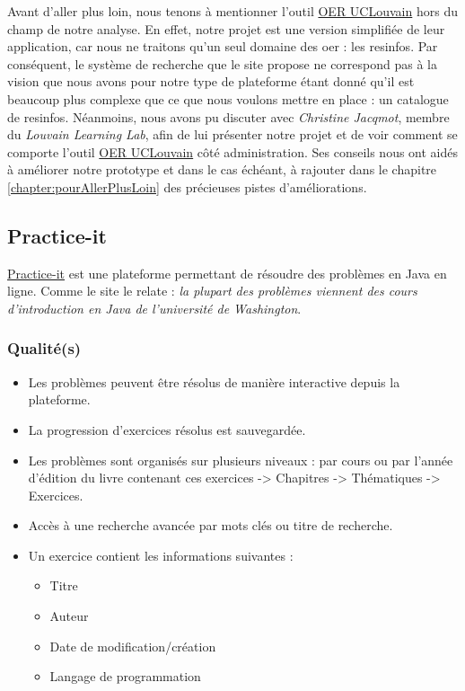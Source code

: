 Avant d'aller plus loin, nous tenons à mentionner l'outil \href{https://oer.uclouvain.be/}{OER UCLouvain} hors du champ de notre analyse. En effet, notre projet est une version simplifiée de leur application, car nous ne traitons qu'un seul domaine des \gls{oer} : les \glspl{resinfo}. Par conséquent, le système de recherche que le site propose ne correspond pas à la vision que nous avons pour notre type de plateforme étant donné qu'il est beaucoup plus complexe que ce que nous voulons mettre en place : un catalogue de \glspl{resinfo}. Néanmoins, nous avons pu discuter avec \textit{Christine Jacqmot}, membre du \textit{Louvain Learning Lab}, afin de lui présenter notre projet et de voir comment se comporte l'outil \href{https://oer.uclouvain.be/}{OER UCLouvain} côté administration. Ses conseils nous ont aidés à améliorer notre prototype et dans le cas échéant, à rajouter dans le chapitre \ref{chapter:pourAllerPlusLoin} des précieuses pistes d'améliorations.
\pagebreak
\subsection*{Practice-it}

\href{https://practiceit.cs.washington.edu/problem/list}{Practice-it} est une plateforme permettant de résoudre des problèmes en Java en ligne. Comme le site le relate : \textit{la plupart des problèmes viennent des cours d'introduction en Java de l'université de Washington}.

\subsubsection*{Qualité(s)}

\begin{itemize}
    \item Les problèmes peuvent être résolus de manière interactive depuis la plateforme.
    \item La progression d'exercices résolus est sauvegardée.
    \item Les problèmes sont organisés sur plusieurs niveaux : par cours ou par l'année d'édition du livre contenant ces exercices -> Chapitres -> Thématiques -> Exercices.
    \item Accès à une recherche avancée par mots clés ou titre de recherche.
    \item Un exercice contient les informations suivantes :
    \begin{itemize}
        \item Titre
        \item Auteur
        \item Date de modification/création
        \item Langage de programmation
    \end{itemize}
\end{itemize}

